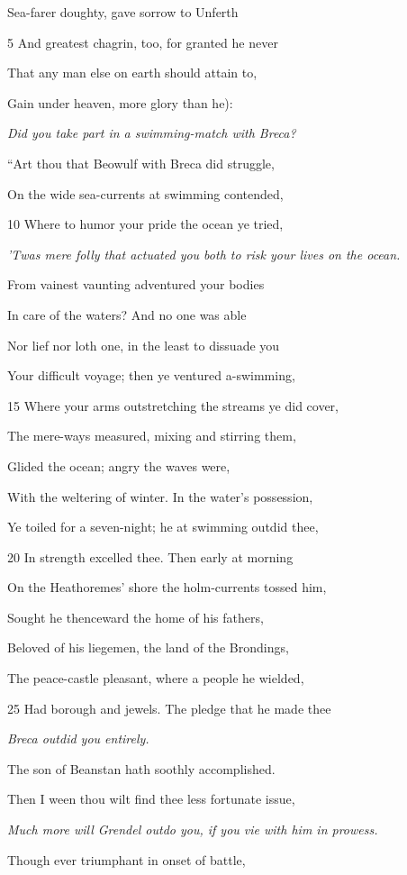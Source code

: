 Sea-farer doughty, gave sorrow to Unferth

5
And greatest chagrin, too, for granted he never

That any man else on earth should attain to,

Gain under heaven, more glory than he):

\emph{Did you take part
in a swimming-match
with Breca?}

“Art thou that Beowulf with Breca did struggle,

On the wide sea-currents at swimming contended,

10
Where to humor your pride the ocean ye tried,

\emph{’Twas mere folly
that actuated you
both to risk your
lives on the ocean.}

From vainest vaunting adventured your bodies

In care of the waters? And no one was able

Nor lief nor loth one, in the least to dissuade you

Your difficult voyage; then ye ventured a-swimming,

15
Where your arms outstretching the streams ye did cover,

The mere-ways measured, mixing and stirring them,

Glided the ocean; angry the waves were,

With the weltering of winter. In the water’s possession,

Ye toiled for a seven-night; he at swimming outdid thee,

20
In strength excelled thee. Then early at morning

On the Heathoremes’ shore the holm-currents tossed him,

Sought he thenceward the home of his fathers,

Beloved of his liegemen, the land of the Brondings,

The peace-castle pleasant, where a people he wielded,

25
Had borough and jewels. The pledge that he made thee

\emph{Breca outdid you
entirely.}

The son of Beanstan hath soothly accomplished.

Then I ween thou wilt find thee less fortunate issue,

\emph{Much more will
Grendel outdo you,
if you vie with him
in prowess.}

Though ever triumphant in onset of battle,

